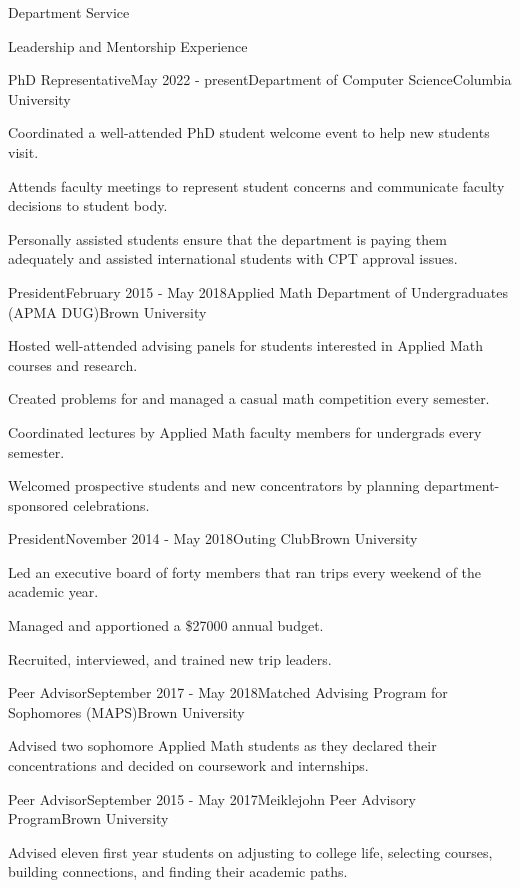 \documentclass{resume} %
\begin{document}
\begin{rSection}{Department Service}
\begin{rSection}{Leadership and Mentorship Experience}
\begin{rSubsection}{PhD Representative}{May 2022 - present}{Department of Computer Science}{Columbia University}
\item Coordinated a well-attended PhD student welcome event to help new students visit.
\item Attends faculty meetings to represent student concerns and communicate faculty decisions to student body.
\item Personally assisted students ensure that the department is paying them adequately and assisted international students with CPT approval issues.
\end{rSubsection}


\begin{rSubsection}{President}{February 2015 - May 2018}{Applied Math Department of Undergraduates (APMA DUG)}{Brown University}
\item Hosted well-attended advising panels for students interested in Applied Math courses and research.
\item Created problems for and managed a casual math competition every semester.
\item Coordinated lectures by Applied Math faculty members for undergrads every semester.
\item Welcomed prospective students and new concentrators by planning department-sponsored celebrations.
\end{rSubsection}

\begin{rSubsection}{President}{November 2014 - May 2018}{Outing Club}{Brown University}
\item Led an executive board of forty members that ran trips every weekend of the academic year.
\item Managed and apportioned a \$27000 annual budget.
\item Recruited, interviewed, and trained new trip leaders.
\end{rSubsection}

\begin{rSubsection}{Peer Advisor}{September 2017 - May 2018}{Matched Advising Program for Sophomores (MAPS)}{Brown University}
\item Advised two sophomore Applied Math students as they declared their concentrations and decided on coursework and internships.
\end{rSubsection}

\begin{rSubsection}{Peer Advisor}{September 2015 - May 2017}{Meiklejohn Peer Advisory Program}{Brown University}
\item Advised eleven first year students on adjusting to college life, selecting courses, building connections, and finding their academic paths.
\end{rSubsection}


\end{rSection}
\end{rSection}
\end{document}
